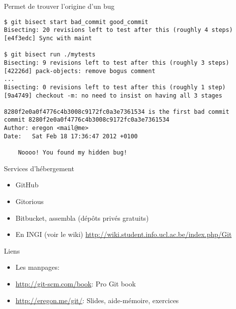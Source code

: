 \begin{frame}[fragile]{}
Permet de trouver l'origine d'un bug

\begin{footnotesize}
\begin{verbatim}
$ git bisect start bad_commit good_commit
Bisecting: 20 revisions left to test after this (roughly 4 steps)
[e4f3edc] Sync with maint

$ git bisect run ./mytests
Bisecting: 9 revisions left to test after this (roughly 3 steps)
[42226d] pack-objects: remove bogus comment
...
Bisecting: 0 revisions left to test after this (roughly 1 step)
[9a4749] checkout -m: no need to insist on having all 3 stages

8280f2e0a0f4776c4b3008c9172fc0a3e7361534 is the first bad commit
commit 8280f2e0a0f4776c4b3008c9172fc0a3e7361534
Author: eregon <mail@me>
Date:   Sat Feb 18 17:36:47 2012 +0100

    Noooo! You found my hidden bug!
\end{verbatim}
\end{footnotesize}
\end{frame}


\begin{frame}{Services d'hébergement}
  \begin{itemize}
    \item GitHub
    \medskip
    \item Gitorious
    \medskip
    \item Bitbucket, assembla (dépôts privés gratuits)
    \medskip
    \item En INGI (voir le wiki)
          \url{http://wiki.student.info.ucl.ac.be/index.php/Git}
  \end{itemize}
\end{frame}

\begin{frame}{Liens}
\begin{itemize}
  \item Les manpages: 
  \item \url{http://git-scm.com/book}: Pro Git book
  \item \url{http://eregon.me/git/}: Slides, aide-mémoire, exercices
\end{itemize}
\end{frame}
\usebackgroundtemplate{}
